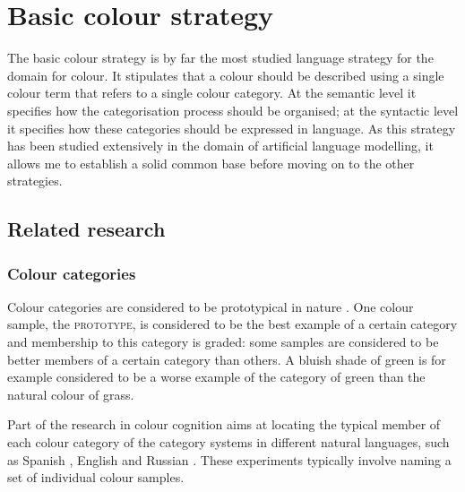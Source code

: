\chapter{Basic colour strategy}
\label{s:basic-strategy}
\label{s:first-strategy}

The basic colour strategy is by far the most studied language
strategy for the domain for colour. It stipulates that a colour should
be described using a single colour term that refers to a single colour
category. At the semantic level it specifies how the categorisation
process should be organised; at the syntactic level it specifies how
these categories should be expressed in language. As this strategy has
been studied extensively in the domain of artificial language
modelling, it allows me to establish a solid common base before moving
on to the other strategies.

\section{Related research}

\subsection{Colour categories}

Colour categories are considered to be
prototypical in nature \citep{rosch73natural}. One colour sample, the
\textsc{prototype}, is considered
to be the best example of a certain category and membership to this
category is graded: some samples are considered to be better members
of a certain category than others. A bluish shade of green is for
example considered to be a worse example of the category of green than
the natural colour of grass.


Part of the research in colour cognition aims at locating the typical
member of each colour category of the category systems in different
natural languages, such as Spanish \citep{lillo07locating}, English
\citep{boynton87locating, sturges95location} and Russian
\citep{safuanova07russian}. These experiments typically involve naming
a set of individual colour samples.

